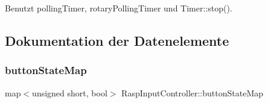 Benutzt polling\+Timer, rotary\+Polling\+Timer und Timer\+::stop().



\subsection{Dokumentation der Datenelemente}
\mbox{\label{class_rasp_input_controller_ae02dcbb81abe6b6e6e3eaaeef4f3bf4a}} 
\subsubsection{\texorpdfstring{button\+State\+Map}{buttonStateMap}}
{\footnotesize\ttfamily map$<$unsigned short, bool$>$ Rasp\+Input\+Controller\+::button\+State\+Map\hspace{0.3cm}{\ttfamily [private]}}

